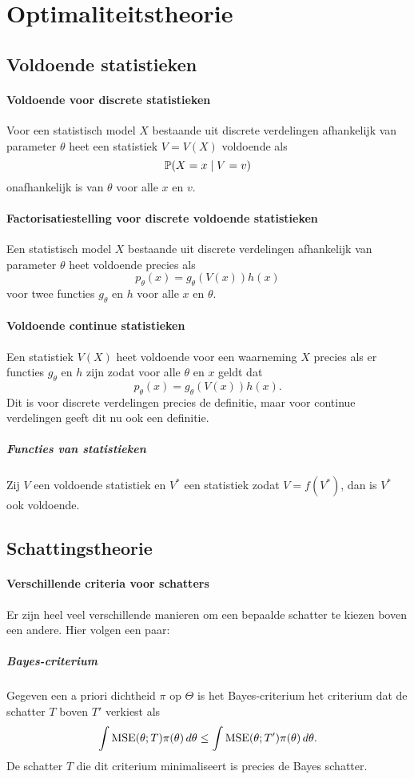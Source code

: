 \section{Optimaliteitstheorie}
\subsection{Voldoende statistieken}
\paragraph{Voldoende voor discrete statistieken} Voor een statistisch model \(X\) bestaande uit discrete verdelingen afhankelijk van parameter \(\theta\) heet een statistiek \(V=V(X)\) voldoende als
\[
    \mathbb{P}(X=x\mid V=v)
\]
onafhankelijk is van \(\theta\) voor alle \(x\) en \(v\).
\paragraph{Factorisatiestelling voor discrete voldoende statistieken}  Een statistisch model \(X\) bestaande uit discrete verdelingen afhankelijk van parameter \(\theta\) heet voldoende precies als
\[
    p_{\theta}(x)=g_{\theta}(V(x))h(x)
\]
voor twee functies \(g_{\theta}\) en \(h\) voor alle \(x\) en \(\theta\).

\paragraph{Voldoende continue statistieken} Een statistiek \(V(X)\) heet voldoende voor een waarneming \(X\) precies als er functies \(g_{\theta}\) en \(h\) zijn zodat voor alle \(\theta\) en \(x\) geldt dat
\[
    p_{\theta}(x)=g_{\theta}(V(x))h(x).
\]
Dit is voor discrete verdelingen precies de definitie, maar voor continue verdelingen geeft dit nu ook een definitie.

\subparagraph{Functies van statistieken} Zij \(V\) een voldoende statistiek en \(V^{*}\) een statistiek zodat \(V=f(V^{*})\), dan is \(V^{*}\) ook voldoende.

\subsection{Schattingstheorie}
\paragraph{Verschillende criteria voor schatters} Er zijn heel veel verschillende manieren om een bepaalde schatter te kiezen boven een andere. Hier volgen een paar:
\subparagraph{Bayes-criterium} Gegeven een a priori dichtheid \(\pi\) op \(\Theta\) is het Bayes-criterium het criterium dat de schatter \(T\) boven \(T'\) verkiest als
\[
    \int \operatorname{MSE}(\theta;T)\pi(\theta)\,d\theta\leq\int \operatorname{MSE}(\theta;T')\pi(\theta)\,d\theta.
\]
De schatter \(T\) die dit criterium minimaliseert is precies de Bayes schatter.


